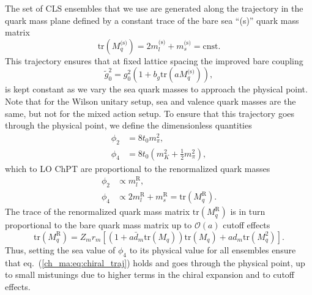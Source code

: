 The set of CLS ensembles that we use are generated along the trajectory in the quark mass plane defined by a constant trace of the bare sea ``(s)'' quark mass matrix
\begin{equation}
\label{ch_ma:eq:chiral_traj}
{\textrm{tr}}\left(M_q^{\textrm{(s)}}\right)=2m_l^{\textrm{(s)}}+m_s^{\textrm{(s)}}={\textrm{cnst}}.
\end{equation}
This trajectory ensures that at fixed lattice spacing the improved bare coupling 
\begin{equation}
\tilde{g}_0^2=g_0^2\left(1+b_g{\textrm{tr}}\left(aM_q^{\textrm{(s)}}\right)\right),
\end{equation}
is kept constant as we vary the sea quark masses to approach the physical point. Note that for the Wilson unitary setup, sea and valence quark masses are the same, but not for the mixed action setup. To ensure that this trajectory goes through the physical point, we define the dimensionless quantities
\begin{align}
\phi_2&=8t_0m_{\pi}^2,\\
\phi_4&=8t_0\left(m_K^2+\frac{1}{2}m_{\pi}^2\right),
\end{align}
which to LO ChPT are proportional to the renormalized quark masses
\begin{align}
\phi_2&\propto m_l^{\textrm{R}},\\
\phi_4&\propto2m_l^{\textrm{R}}+m_s^{\textrm{R}}={\textrm{tr}}\left(M_q^{\textrm{R}}\right).
\end{align}
The trace of the renormalized quark mass matrix ${\textrm{tr}}\left(M_q^{\textrm{R}}\right)$ is in turn proportional to the bare quark mass matrix up to $\mathcal{O}(a)$ cutoff effects
\begin{equation}
{\textrm{tr}}\left(M_q^{\textrm{R}}\right)=Z_mr_m\left[\left(1+a\bar{d}_m{\textrm{tr}}\left(M_q\right)\right){\textrm{tr}}\left(M_q\right)+ad_m{\textrm{tr}}\left(M_q^2\right)\right].
\end{equation}
Thus, setting the sea value of $\phi_4$ to its physical value for all ensembles ensure that eq.~(\ref{ch_ma:eq:chiral_traj}) holds and goes through the physical point, up to small mistunings due to higher terms in the chiral expansion and to cutoff effects. 


